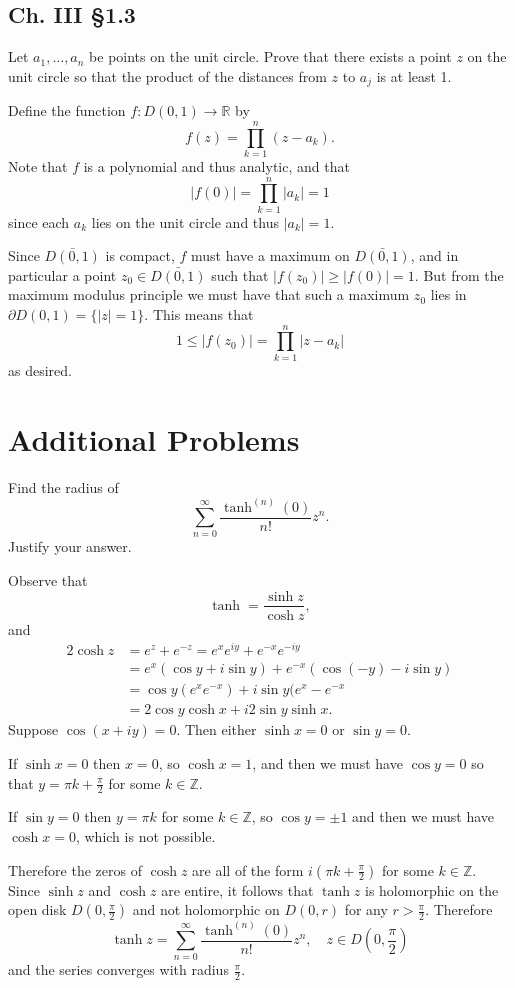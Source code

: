 \documentclass{article}
\newcommand\horline{\noindent\makebox[\linewidth]{\rule{\textwidth}{0.4pt}}}
\newcounter{Problem}
\newenvironment{Problem}{\begin{Exercise}[name={Problem},
                                          counter={Problem}]}
                        {\end{Exercise}}
\begin{document}
\subsection*{Ch. III \S 1.3}
Let $a_1, \dots, a_n$ be points on the unit circle. Prove that there
exists a point $z$ on the unit circle so that the product of the 
distances from $z$ to $a_j$ is at least 1. 

\horline

Define the function $f : D(0, 1) \to \mathbb{R}$ by
$$
f(z) = \prod_{k=1}^n (z - a_k).
$$
Note that $f$ is a polynomial and thus analytic, and that
$$
|f(0)| = \prod_{k=1}^n |a_k| = 1
$$
since each $a_k$ lies on the unit circle and thus $|a_k| = 1$.

Since $\bar{D(0, 1)}$ is compact, $f$ must have a maximum
on $\bar{D(0, 1)}$, and in particular a point $z_0 \in \bar{D(0,1)}$
such that $|f(z_0)| \geq |f(0)| = 1$. But from the maximum modulus
principle we must have that such a maximum
$z_0$ lies in $\partial D(0, 1) = \{ |z| = 1 \}$. This means that
$$
1 \leq |f(z_0)| = \prod_{k=1}^n |z - a_k|
$$
as desired.

\section{Additional Problems}
\begin{Problem}
Find the radius of
$$
\sum_{n=0}^\infty \frac{\tanh^{(n)}(0)}{n!} z^n.
$$
Justify your answer.
\end{Problem}

\begin{Answer}
Observe that
$$
\tanh = \frac{\sinh z}{\cosh z},
$$
and
\begin{align*}
   2\cosh z
&= e^z + e^{-z} = e^x e^{iy} + e^{-x} e^{-iy} \\
&= e^x (\cos y + i \sin y) + e^{-x} (\cos (-y) - i \sin y) \\
&= \cos y (e^x e^{-x}) + i \sin y (e^x - e^{-x} \\
&= 2 \cos y \cosh x + i 2 \sin y \sinh x.
\end{align*}
Suppose $\cos (x + iy) = 0$. Then either
$\sinh x = 0$ or $\sin y = 0$. 

If $\sinh x = 0$ then $x = 0$, so $\cosh x = 1$, 
and then we must have
$\cos y = 0$ so that 
$y = \pi k + \frac{\pi}{2}$ for some $k \in \mathbb{Z}$.

If $\sin y = 0$ then $y = \pi k$ for some $k \in \mathbb{Z}$,
so $\cos y = \pm 1$ and then we must have $\cosh x = 0$, which is
not possible.

Therefore the zeros of $\cosh z$ are all of the form
$i \left( \pi k + \frac{\pi}{2} \right)$ for some $k \in \mathbb{Z}$.
Since $\sinh z$ and $\cosh z$ are entire, it follows that
$\tanh z$ is holomorphic on the open disk $D\left(0, \frac{\pi}{2}\right)$
and not holomorphic on $D(0, r)$ for any $r > \frac{\pi}{2}$.
Therefore
$$
\tanh z = \sum_{n=0}^\infty \frac{\tanh^{(n)}(0)}{n!} z^n, \quad
z \in D\left(0, \frac{\pi}{2}\right)
$$
and the series converges with radius $\frac{\pi}{2}$.
\end{Answer}
\end{document}
